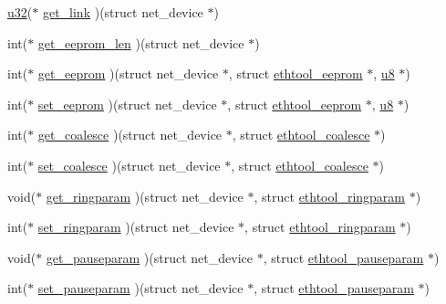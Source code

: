 \begin{DoxyCompactItemize}
\item 
\hyperlink{lib_2igb_2e1000__osdep_8h_a64e91c10a0d8fb627e92932050284264}{u32}($\ast$ \hyperlink{struct__kc__ethtool__ops_a307865bb1477a00183755924a7b40e08}{get\+\_\+link} )(struct net\+\_\+device $\ast$)
\item 
int($\ast$ \hyperlink{struct__kc__ethtool__ops_a420a9ceaead25258ac805b4a03d3b0ec}{get\+\_\+eeprom\+\_\+len} )(struct net\+\_\+device $\ast$)
\item 
int($\ast$ \hyperlink{struct__kc__ethtool__ops_ae5fbeffc7284c796e26e8fc8dba287f5}{get\+\_\+eeprom} )(struct net\+\_\+device $\ast$, struct \hyperlink{structethtool__eeprom}{ethtool\+\_\+eeprom} $\ast$, \hyperlink{lib_2igb_2e1000__osdep_8h_a8baca7e76da9e0e11ce3a275dd19130c}{u8} $\ast$)
\item 
int($\ast$ \hyperlink{struct__kc__ethtool__ops_a6cb22a933ddb8f8ebec99311ec6ba279}{set\+\_\+eeprom} )(struct net\+\_\+device $\ast$, struct \hyperlink{structethtool__eeprom}{ethtool\+\_\+eeprom} $\ast$, \hyperlink{lib_2igb_2e1000__osdep_8h_a8baca7e76da9e0e11ce3a275dd19130c}{u8} $\ast$)
\item 
int($\ast$ \hyperlink{struct__kc__ethtool__ops_a01c981af71eef1a4dd123237bfee2db0}{get\+\_\+coalesce} )(struct net\+\_\+device $\ast$, struct \hyperlink{kcompat_8h_a88fa035fec6b4ef68bb34dab55f3ad97}{ethtool\+\_\+coalesce} $\ast$)
\item 
int($\ast$ \hyperlink{struct__kc__ethtool__ops_a86918cd34f9b78602b66a6b651c12124}{set\+\_\+coalesce} )(struct net\+\_\+device $\ast$, struct \hyperlink{kcompat_8h_a88fa035fec6b4ef68bb34dab55f3ad97}{ethtool\+\_\+coalesce} $\ast$)
\item 
void($\ast$ \hyperlink{struct__kc__ethtool__ops_a44ff1c58a0ad4142bc1a7526f69f1daa}{get\+\_\+ringparam} )(struct net\+\_\+device $\ast$, struct \hyperlink{kcompat_8h_aa0f9281f1f6fef10992f4e8ae9143653}{ethtool\+\_\+ringparam} $\ast$)
\item 
int($\ast$ \hyperlink{struct__kc__ethtool__ops_ab34c07fad2ade1808eb427bd3fddf1a8}{set\+\_\+ringparam} )(struct net\+\_\+device $\ast$, struct \hyperlink{kcompat_8h_aa0f9281f1f6fef10992f4e8ae9143653}{ethtool\+\_\+ringparam} $\ast$)
\item 
void($\ast$ \hyperlink{struct__kc__ethtool__ops_a266d14b370d8696d91e56070a02f802c}{get\+\_\+pauseparam} )(struct net\+\_\+device $\ast$, struct \hyperlink{kcompat_8h_a25d94d0b4f727dc72793458fc0cc5364}{ethtool\+\_\+pauseparam} $\ast$)
\item 
int($\ast$ \hyperlink{struct__kc__ethtool__ops_a46fae36c29482f58ff935ad78ba6211d}{set\+\_\+pauseparam} )(struct net\+\_\+device $\ast$, struct \hyperlink{kcompat_8h_a25d94d0b4f727dc72793458fc0cc5364}{ethtool\+\_\+pauseparam} $\ast$)

\end{DoxyCompactItemize}
